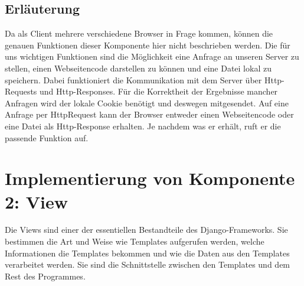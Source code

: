 \subsection{Erl\"auterung}

Da als Client mehrere verschiedene Browser in Frage kommen, können die genauen
Funktionen dieser Komponente hier nicht beschrieben werden. Die für uns
wichtigen Funktionen sind die Möglichkeit eine Anfrage an unseren Server zu
stellen, einen Webseitencode darstellen zu können und eine Datei lokal zu
speichern. Dabei funktioniert die Kommunikation mit dem Server über
Http-Requests und Http-Responses. Für die Korrektheit der Ergebnisse mancher
Anfragen wird der lokale Cookie benötigt und deswegen mitgesendet. 
Auf eine Anfrage per HttpRequest kann der Browser entweder einen Webseitencode 
oder eine Datei als Http-Response erhalten. Je nachdem was er erhält, ruft er 
die passende Funktion auf. 


\section{Implementierung von Komponente
         2: View}


Die Views sind einer der essentiellen Bestandteile des Django-Frameworks. Sie
bestimmen die Art und Weise wie Templates aufgerufen werden, welche
Informationen die Templates bekommen und wie die Daten aus den Templates
verarbeitet werden. Sie sind die Schnittstelle zwischen den Templates und dem
Rest des Programmes.

